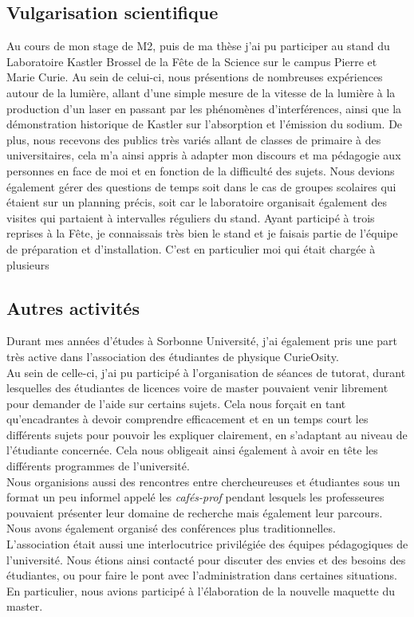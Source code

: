 \documentclass[a4paper,11pt]{article} %
\newcommand{\pointmedian}{\fontfamily{cmr}\selectfont\textperiodcentered}
\begin{document}
	\subsection{Vulgarisation scientifique}
	Au cours de mon stage de M2, puis de ma thèse j'ai pu participer au stand du Laboratoire Kastler Brossel de la Fête de la Science sur le campus Pierre et Marie Curie. Au sein de celui-ci, nous présentions de nombreuses expériences autour de la lumière, allant d'une \textgravedbl simple\textacutedbl{} mesure de la vitesse de la lumière à la production d'un laser en passant par les phénomènes d'interférences, ainsi que la démonstration historique de Kastler sur l'absorption et l'émission du sodium. De plus, nous recevons des publics très variés allant de classes de primaire à des universitaires, cela m'a ainsi appris à adapter mon discours et ma pédagogie aux personnes en face de moi et en fonction de la difficulté des sujets. Nous devions également gérer des questions de temps soit dans le cas de groupes scolaires qui étaient sur un planning précis, soit car le laboratoire organisait également des visites qui partaient à intervalles réguliers du stand. Ayant participé à trois reprises à la Fête, je connaissais très bien le stand et je faisais partie de l'équipe de préparation et d'installation. C'est en particulier moi qui était chargée à plusieurs 
	
	\subsection{Autres activités}
	Durant mes années d'études à Sorbonne Université, j'ai également pris une part très active dans l'association des étudiant\pointmedian es de physique CurieOsity.\\ 
	Au sein de celle-ci, j'ai pu participé à l'organisation de séances de tutorat, durant lesquelles des étudiant\pointmedian es de licences voire de master pouvaient venir librement pour demander de l'aide sur certains sujets. Cela nous forçait en tant qu'encadrant\pointmedian es à devoir comprendre efficacement et en un temps court les différents sujets pour pouvoir les expliquer clairement, en s'adaptant au niveau de l'étudiant\pointmedian e concerné\pointmedian e. Cela nous obligeait ainsi également à avoir en tête les différents programmes de l'université.\\
	Nous organisions aussi des rencontres entre chercheur\pointmedian euses et étudiant\pointmedian es sous un format un peu informel appelé les \textit{cafés-prof} pendant lesquels les professeur\pointmedian es pouvaient présenter leur domaine de recherche mais également leur parcours. Nous avons également organisé des conférences plus traditionnelles.\\
	L'association était aussi une interlocutrice privilégiée des équipes pédagogiques de l'université. Nous étions ainsi contacté pour discuter des envies et des besoins des étudiant\pointmedian es, ou pour faire le pont avec l'administration dans certaines situations. En particulier, nous avions participé à l'élaboration de la nouvelle maquette du master.\\
	
\end{document}
